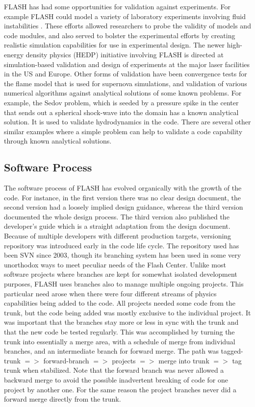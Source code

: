 FLASH has had some opportunities for validation against
experiments. For example FLASH could model a variety of laboratory
experiments involving fluid instabilities
\cite{Dimonte2004,Kane2001}. These efforts allowed researchers to
probe the validity of models and code modules, and also served to
bolster the experimental efforts by creating realistic simulation
capabilities for use in experimental design. The newer high-energy
density physics (HEDP) initiative involving FLASH  
is directed at simulation-based validation and design of
experiments at the major laser facilities in the US and
Europe. Other forms of validation have been convergence tests for the
flame model that is used for supernova simulations, and validation of
various numerical algorithms against analytical solutions of some
known problems. For example, the Sedov \cite{} problem, which is
seeded by a pressure spike in the center that sends out a spherical
shock-wave into the domain has a known analytical solution. It is used
to validate hydrodynamics in the code. There are several other similar
examples where a simple problem can help to validate a code capability
through known analytical solutions. 

\subsection{Software Process}
\label{sec:FLASHSoftwareProcess} 
The software process of FLASH has evolved organically with the growth
of the code. For instance, in the first version there was no clear
design document, the second version had a loosely implied design
guidance, whereas the third version documented the whole design
process. The third version also published the developer's guide which
is a straight adaptation from the design document. Because of multiple
developers with different production targets, versioning repository was
introduced early in the code life cycle. The repository used has been
SVN since 2003, though its branching system has been used in some very
unorthodox ways to meet peculiar needs of the Flash Center. Unlike
most software projects where branches are kept for somewhat isolated
development purposes, FLASH uses branches also to manage multiple
ongoing projects. This particular need arose when there were four
different streams of physics capabilities being added to the code. All
projects needed some code from the trunk, but the code being added was
mostly exclusive to the individual project. It was important that the
branches stay more or less in sync with the trunk and that the new
code be tested regularly. This was accomplished by turning the trunk
into essentially a merge area, with a schedule of merge from 
individual branches, and an intermediate branch for forward merge. The
path was tagged-trunk $=>$ forward-branch $=>$ projects $=>$ merge into
trunk $=>$ tag trunk when stabilized. Note that the forward branch was
never allowed a backward merge to avoid the possible inadvertent
breaking of code for one project by another one. For the same reason
the project branches never did a forward merge directly from the
trunk. 

